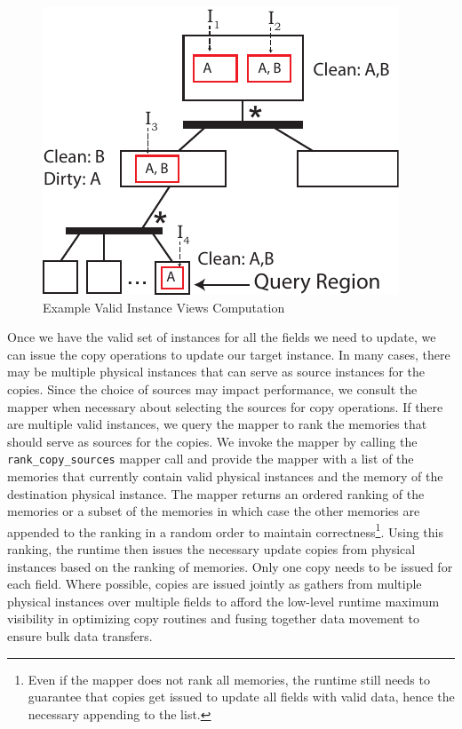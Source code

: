 \begin{figure}[t]
\centering
\includegraphics[scale=0.9]{figs/ValidViews.pdf}
\caption{Example Valid Instance Views Computation\label{fig:validtrav}}
\end{figure}

Once we have the valid set of instances for
all the fields we need to update, we can issue
the copy operations to update our target
instance. In many cases, there may be multiple
physical instances that can serve as source
instances for the copies. Since the choice
of sources may impact performance, we consult
the mapper when necessary about selecting the
sources for copy operations. If there are multiple
valid instances, we query the mapper
to rank the memories that should serve as 
sources for the copies. We invoke the mapper
by calling the {\tt rank\_copy\_sources} mapper
call and provide the mapper with a list of 
the memories that currently contain valid 
physical instances and the memory of the 
destination physical instance. The mapper
returns an ordered ranking of the memories
or a subset of the memories in which case
the other memories are appended to the ranking
in a random order to maintain correctness\footnote{
Even if the mapper does not rank all memories, the
runtime still needs to guarantee that copies get
issued to update all fields with valid data, hence 
the necessary appending to the list.}. Using this ranking, 
the runtime then issues the necessary update
copies from physical instances based on the
ranking of memories. Only one copy needs to
be issued for each field.  Where possible,
copies are issued jointly as gathers from
multiple physical instances over multiple
fields to afford the low-level runtime 
maximum visibility in optimizing copy 
routines and fusing together data movement
to ensure bulk data transfers.

